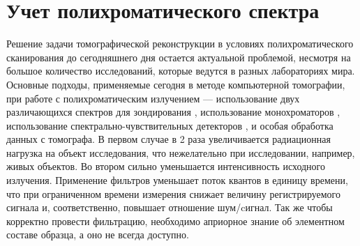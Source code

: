 \begin{comment}

\todo{введение - обзор из статьи аит2013 и бакалаврского диплома}

 Предлагаются новые версии алгоритмов, основанных на алгебраическом подходе, способных работать с сильно зашумлёнными проекциями. Такое условие сформировано необходимостью сокращать время регистрации проекций. Для некоторых применений уменьшение времени регистрации связано с требованием сокращения дозы облучения, для других --- обусловлено высокой динамикой поведения исследуемого объекта. Также следует отметить, что алгебраические методы реконструкции незаменимы, когда речь идет об экспериментах с малым числом проекционных углов и измерениях в ограниченном телесном угле. Только алгебраические методы применимы для решения задач трансмиссионно-эмиссионной томографии, если ослаблением зондирующего и вторичного излучений пренебречь нельзя.




\end{comment}

\section{Учет полихроматического спектра}
Решение задачи томографической реконструкции в условиях полихроматического сканирования \cite{Herman1979bh} до сегодняшнего дня остается актуальной проблемой, несмотря на большое количество исследований, которые ведутся в разных лабораториях мира.
Основные подходы, применяемые сегодня в методе компьютерной томографии, при работе с полихроматическим излучением --- использование двух различающихся спектров для зондирования \cite{graser2009dual, marin_2014_dual_energy_ct, kuchenbecker2015dual}, использование монохроматоров \cite{tan2012beam}, использование спектрально-чувствительных детекторов \cite{sidky2018three}, и особая обработка данных с томографа. 
В первом случае в 2 раза увеличивается радиационная нагрузка на объект исследования, что нежелательно при исследовании, например, живых объектов.
Во втором сильно уменьшается интенсивность исходного излучения.
Применение фильтров уменьшает поток квантов в единицу времени, что при ограниченном времени измерения снижает величину регистрируемого сигнала и, соответственно, повышает отношение шум/cигнал. 
Так же чтобы корректно провести фильтрацию, необходимо априорное знание об элементном составе образца, а оно не всегда доступно.

